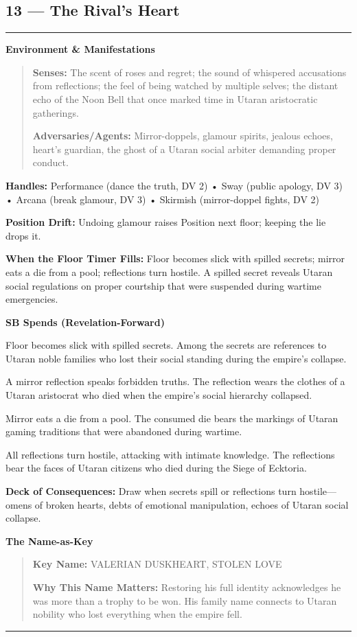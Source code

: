 \documentclass[18pt, letterpaper, twoside]{article}
\newenvironment{floorbox}[1]{%
    \begin{center}
    \begin{minipage}{0.95\textwidth}
    \subsection*{#1}
    \vspace{-0.5em}
    \rule{\textwidth}{0.5pt}
    \vspace{0.5em}
}{%
    \vspace{0.5em}
    \rule{\textwidth}{0.5pt}
    \end{minipage}
    \end{center}
}
\newenvironment{gmnote}[1]{%
    \vspace{0.5em}
    \noindent\textbf{#1}
    \begin{quote}
}{%
    \end{quote}
    \vspace{0.5em}
}
\newcommand{\handles}[1]{\noindent\textbf{Handles:} #1\par}
\newcommand{\sbitem}[2]{\item[#1 SB:] #2}
\newcommand{\deckdraw}[1]{\noindent\textbf{Deck of Consequences:} #1\par}
\newcommand{\keyname}[1]{\noindent\textbf{Key Name:} #1\par}
\newcommand{\nameimportance}[1]{\noindent\textbf{Why This Name Matters:} #1\par}
\begin{document}
\begin{floorbox}{13 --- The Rival's Heart}
\begin{gmnote}{Environment \& Manifestations}
\textbf{Senses:} The scent of roses and regret; the sound of whispered accusations from reflections; the feel of being watched by multiple selves; the distant echo of the Noon Bell that once marked time in Utaran aristocratic gatherings.

\textbf{Adversaries/Agents:} Mirror-doppels, glamour spirits, jealous echoes, heart's guardian, the ghost of a Utaran social arbiter demanding proper conduct.
\end{gmnote}

\handles{Performance (dance the truth, DV 2) • Sway (public apology, DV 3) • Arcana (break glamour, DV 3) • Skirmish (mirror-doppel fights, DV 2)}

\textbf{Position Drift:} Undoing glamour raises Position next floor; keeping the lie drops it.

\textbf{When the Floor Timer Fills:} Floor becomes slick with spilled secrets; mirror eats a die from a pool; reflections turn hostile. A spilled secret reveals Utaran social regulations on proper courtship that were suspended during wartime emergencies.

\textbf{SB Spends (Revelation-Forward)}
\begin{description}[leftmargin=*, style=unboxed]
    \sbitem{1}{Floor becomes slick with spilled secrets. Among the secrets are references to Utaran noble families who lost their social standing during the empire's collapse.}
    \sbitem{2}{A mirror reflection speaks forbidden truths. The reflection wears the clothes of a Utaran aristocrat who died when the empire's social hierarchy collapsed.}
    \sbitem{3}{Mirror eats a die from a pool. The consumed die bears the markings of Utaran gaming traditions that were abandoned during wartime.}
    \sbitem{4+}{All reflections turn hostile, attacking with intimate knowledge. The reflections bear the faces of Utaran citizens who died during the Siege of Ecktoria.}
\end{description}

\deckdraw{Draw when secrets spill or reflections turn hostile---omens of broken hearts, debts of emotional manipulation, echoes of Utaran social collapse.}

\begin{gmnote}{The Name-as-Key}
\keyname{VALERIAN DUSKHEART, STOLEN LOVE}
\nameimportance{Restoring his full identity acknowledges he was more than a trophy to be won. His family name connects to Utaran nobility who lost everything when the empire fell.}


\end{gmnote}
\end{floorbox}
\end{document}
